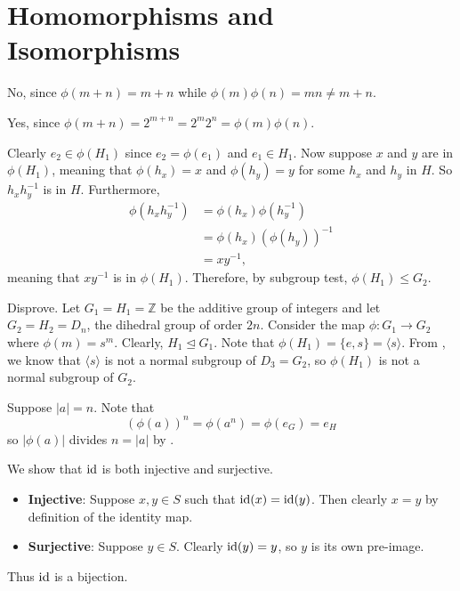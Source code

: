 \section{Homomorphisms and Isomorphisms}
\begin{questions}
    \item \begin{partquestions}{\alph*}
        \item No, since $\phi(m+n) = m + n$ while $\phi(m)\phi(n) = mn \neq m+n$.
        \item Yes, since $\phi(m+n) = 2^{m+n} = 2^m2^n = \phi(m)\phi(n)$.
    \end{partquestions}

    \item Clearly $e_2 \in \phi(H_1)$ since $e_2 = \phi(e_1)$ and $e_1 \in H_1$. Now suppose $x$ and $y$ are in $\phi(H_1)$, meaning that $\phi(h_x) = x$ and $\phi(h_y) = y$ for some $h_x$ and $h_y$ in $H$. So $h_xh_y^{-1}$ is in $H$. Furthermore,
    \begin{align*}
        \phi(h_xh_y^{-1}) &= \phi(h_x)\phi(h_y^{-1})\\
        &= \phi(h_x)\left(\phi(h_y)\right)^{-1}\\
        &= xy^{-1},
    \end{align*}
    meaning that $xy^{-1}$ is in $\phi(H_1)$. Therefore, by subgroup test, $\phi(H_1) \leq G_2$.

    \item Disprove. Let $G_1 = H_1 = \mathbb{Z}$ be the additive group of integers and let $G_2 = H_2 = D_n$, the dihedral group of order $2n$. Consider the map $\phi: G_1 \to G_2$ where $\phi(m) = s^m$. Clearly, $H_1 \unlhd G_1$. Note that $\phi(H_1) = \{e, s\} = \langle s \rangle$. From , we know that $\langle s \rangle$ is not a normal subgroup of $D_3 = G_2$, so $\phi(H_1)$ is not a normal subgroup of $G_2$.

    \item Suppose $|a| = n$. Note that
    \[
        \left(\phi(a)\right)^n = \phi\left(a^n\right) = \phi(e_G) = e_H
    \]
    so $|\phi(a)|$ divides $n = |a|$ by .

    \item \begin{partquestions}{\roman*}
        \item We show that $\mathrm{id}$ is both injective and surjective.
        \begin{itemize}
            \item \textbf{Injective}: Suppose $x, y \in S$ such that $\mathrm{id}(x) = \mathrm{id}(y)$. Then clearly $x = y$ by definition of the identity map.
            \item \textbf{Surjective}: Suppose $y \in S$. Clearly $\mathrm{id}(y) = y$, so $y$ is its own pre-image.
        \end{itemize}
        Thus $\mathrm{id}$ is a bijection.


\end{partquestions}
\end{questions}
